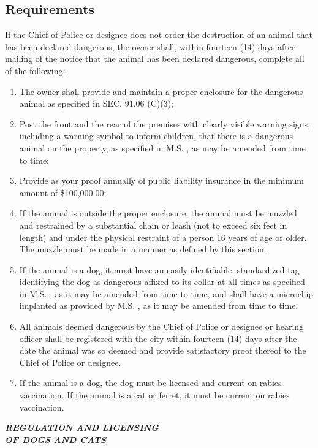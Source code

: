 \documentclass[code.tex]{subfiles}
\begin{document}
\subsection{Requirements}
If the Chief of Police or designee does not order the destruction of an animal that has been declared dangerous, the owner shall, within fourteen (14) days after mailing of the notice that the animal has been declared dangerous, complete all of the following:
\begin{enumerate}[{\indent}1)]
\item The owner shall provide and maintain a proper enclosure for the dangerous animal as specified in SEC. 91.06 (C)(3);
\item Post the front and the rear of the premises with clearly visible warning signs, including a warning symbol to inform children, that there is a dangerous animal on the property, as specified in M.S. , as may be amended from time to time;
\item Provide as your proof annually of public liability insurance in the minimum amount of \$100,000.00;
\item If the animal is outside the proper enclosure, the animal must be muzzled and restrained by a substantial chain or leash (not to exceed six feet in length) and under the physical restraint of a person 16 years of age or older.  The muzzle must be made in a manner as defined by this section.
\item If the animal is a dog, it must have an easily identifiable, standardized tag identifying the dog as dangerous affixed to its collar at all times as specified in M.S. , as it may be amended from time to time, and shall have a microchip implanted as provided by M.S. , as it may be amended from time to time.
\item All animals deemed dangerous by the Chief of Police or designee or hearing officer shall be registered with the city within fourteen (14) days after the date the animal was so deemed and provide satisfactory proof thereof to the Chief of Police or designee.
\item If the animal is a dog, the dog must be licensed and current on rabies vaccination.  If the animal is a cat or ferret, it must be current on rabies vaccination.
\end{enumerate}

\begin{center}
\emph{\textbf{\LARGE{REGULATION AND LICENSING \\OF DOGS AND CATS}}}
\end{center}
\end{document}

